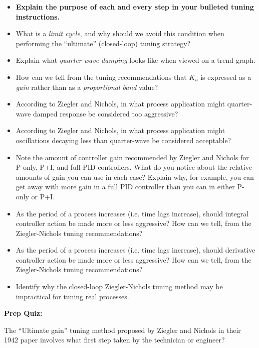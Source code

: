 \begin{itemize}
\item{} {\bf Explain the purpose of each and every step in your bulleted tuning instructions.}
\item{} What is a {\it limit cycle}, and why should we avoid this condition when performing the ``ultimate'' (closed-loop) tuning strategy?
\item{} Explain what {\it quarter-wave damping} looks like when viewed on a trend graph.
\item{} How can we tell from the tuning recommendations that $K_u$ is expressed as a {\it gain} rather than as a {\it proportional band} value?
\item{} According to Ziegler and Nichols, in what process application might quarter-wave damped response be considered too aggressive?
\item{} According to Ziegler and Nichols, in what process application might oscillations decaying less than quarter-wave be considered acceptable?
\item{} Note the amount of controller gain recommended by Ziegler and Nichols for P-only, P+I, and full PID controllers.  What do you notice about the relative amounts of gain you can use in each case?  Explain why, for example, you can get away with more gain in a full PID controller than you can in either P-only or P+I.
\item{} As the period of a process increases (i.e. time lags increase), should integral controller action be made more or less aggressive?  How can we tell, from the Ziegler-Nichols tuning recommendations?
\item{} As the period of a process increases (i.e. time lags increase), should derivative controller action be made more or less aggressive?  How can we tell, from the Ziegler-Nichols tuning recommendations?
\item{} Identify why the closed-loop Ziegler-Nichols tuning method may be impractical for tuning real processes.
\end{itemize}






\vfil \eject

\noindent
{\bf Prep Quiz:}

The ``Ultimate gain'' tuning method proposed by Ziegler and Nichols in their 1942 paper involves what first step taken by the technician or engineer?

